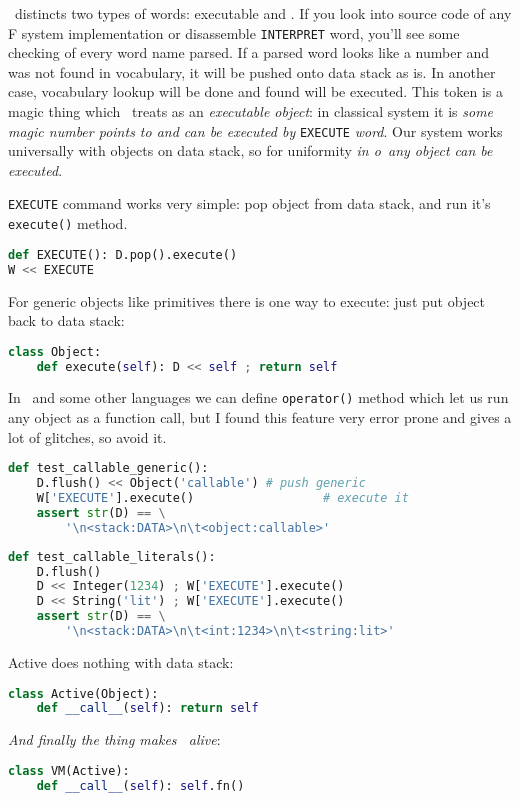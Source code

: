 \clearpage{}

\F\ distincts two types of words: executable and . If you look
into source code of any F system implementation or disassemble \verb|INTERPRET|
word, you'll see some checking of every word name parsed. If a parsed word looks
like a number and was not found in vocabulary, it will be pushed onto data stack
as is. In another case, vocabulary lookup will be done and found  will be executed. This token is a magic thing which \F\ treats as an
\emph{executable object}: in classical system it is \emph{some magic number
points to  and can be executed by} \verb|EXECUTE|
\emph{word}. Our system works universally with objects on data stack, so for
uniformity \emph{in o\F\ any object can be executed}.

\noindent
\verb|EXECUTE| command works very simple: pop object from data stack, and run
it's \verb|execute()| method.

\begin{lstlisting}[language=Python]
def EXECUTE(): D.pop().execute()
W << EXECUTE
\end{lstlisting}

For generic objects like primitives there is one
way to execute: just put object back to data stack:

\begin{lstlisting}[language=Python]
class Object:
	def execute(self): D << self ; return self
\end{lstlisting}

\noindent
In \py\ and some other languages we can define \verb|operator()| method which
let us run any object as a function call, but I found this feature very error
prone and gives a lot of glitches, so avoid it.

\begin{lstlisting}[language=Python]
def test_callable_generic():
	D.flush() << Object('callable')	# push generic
	W['EXECUTE'].execute()					# execute it
	assert str(D) == \
		'\n<stack:DATA>\n\t<object:callable>'
\end{lstlisting}
\begin{lstlisting}[language=Python]
def test_callable_literals():
	D.flush()
	D << Integer(1234) ; W['EXECUTE'].execute()
	D << String('lit') ; W['EXECUTE'].execute()
	assert str(D) == \
		'\n<stack:DATA>\n\t<int:1234>\n\t<string:lit>'
\end{lstlisting}

\clearpage
\noindent Active does nothing with data stack:
\begin{lstlisting}[language=Python]
class Active(Object):
	def __call__(self): return self
\end{lstlisting}

\noindent \emph{And finally the thing makes \F\ alive}: 
\begin{lstlisting}[language=Python]
class VM(Active):
	def __call__(self): self.fn()
\end{lstlisting}

